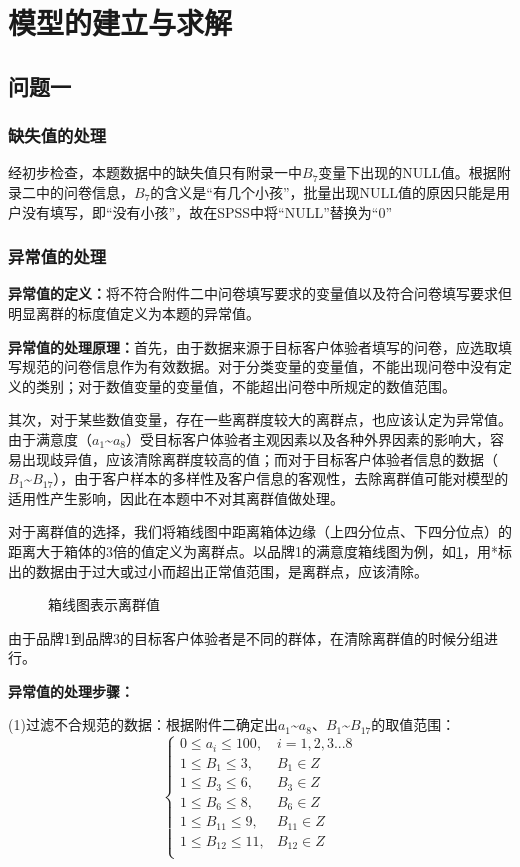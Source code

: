 \documentclass{JXUSTmodeling}
\begin{document}
\section{模型的建立与求解}\label{sec:5}
\subsection{问题一}\label{sub:5.1}
\subsubsection{缺失值的处理}
经初步检查，本题数据中的缺失值只有附录一中$ B_{7} $变量下出现的NULL值。根据附录二中的问卷信息，$ B_{7} $的含义是“有几个小孩”，批量出现NULL值的原因只能是用户没有填写，即“没有小孩”，故在SPSS中将“NULL”替换为“0”
\subsubsection{异常值的处理}
\textbf{异常值的定义：}将不符合附件二中问卷填写要求的变量值以及符合问卷填写要求但明显离群的标度值定义为本题的异常值。

\textbf{异常值的处理原理：}首先，由于数据来源于目标客户体验者填写的问卷，应选取填写规范的问卷信息作为有效数据。对于分类变量的变量值，不能出现问卷中没有定义的类别；对于数值变量的变量值，不能超出问卷中所规定的数值范围。

其次，对于某些数值变量，存在一些离群度较大的离群点，也应该认定为异常值。由于满意度（$ a_{1} $\~{}$ a_{8} $）受目标客户体验者主观因素以及各种外界因素的影响大，容易出现歧异值，应该清除离群度较高的值；而对于目标客户体验者信息的数据（$ B_{1} $\~{}$ B_{17} $），由于客户样本的多样性及客户信息的客观性，去除离群值可能对模型的适用性产生影响，因此在本题中不对其离群值做处理。

对于离群值的选择，我们将箱线图中距离箱体边缘（上四分位点、下四分位点）的距离大于箱体的3倍的值定义为离群点。以品牌1的满意度箱线图为例，如\ref{fig:1}，用*标出的数据由于过大或过小而超出正常值范围，是离群点，应该清除。
\begin{figure}[!htbp]
	\centering
	\caption{箱线图表示离群值}
	\label{fig:1}
\end{figure}

由于品牌1到品牌3的目标客户体验者是不同的群体，在清除离群值的时候分组进行。

\textbf{异常值的处理步骤：}

(1)过滤不合规范的数据：根据附件二确定出$ a_{1} $\~{}$ a_{8} $、$ B_{1} $\~{}$ B_{17} $的取值范围：
$$
\left\{
\begin{array}{ll}
0\leq a_{i} \leq 100,&i = 1,2,3...8 \\
1\leq B_{1}\leq 3,&B_{1}\in Z \\
1\leq B_{3}\leq 6,&B_{3}\in Z \\
1\leq B_{6}\leq 8,&B_{6}\in Z \\
1\leq B_{11}\leq 9,&B_{11}\in Z \\
1\leq B_{12}\leq 11,&B_{12}\in Z \\
\end{array}
\right.
$$
\end{document}
